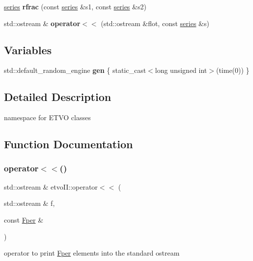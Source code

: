 \begin{DoxyCompactItemize}
\item 
\mbox{\label{namespaceetvo_i_i_a48f35f2917034aa30ea99e89d9da1354}} 
\mbox{\hyperlink{classetvo_i_i_1_1series}{series}} {\bfseries rfrac} (const \mbox{\hyperlink{classetvo_i_i_1_1series}{series}} \&s1, const \mbox{\hyperlink{classetvo_i_i_1_1series}{series}} \&s2)
\item 
\mbox{\label{namespaceetvo_i_i_a96938f46f78231e8b1d4ca37cd3528d6}} 
std\+::ostream \& {\bfseries operator$<$$<$} (std\+::ostream \&flot, const \mbox{\hyperlink{classetvo_i_i_1_1series}{series}} \&s)
\end{DoxyCompactItemize}
\subsection*{Variables}
\begin{DoxyCompactItemize}
\item 
\mbox{\label{namespaceetvo_i_i_a1bfb12d5c99ed9b6c9332f116b3a6c07}} 
std\+::default\+\_\+random\+\_\+engine {\bfseries gen} \{ static\+\_\+cast$<$long unsigned int$>$(time(0)) \}
\end{DoxyCompactItemize}


\subsection{Detailed Description}
namespace for E\+T\+VO classes 

\subsection{Function Documentation}
\mbox{\label{namespaceetvo_i_i_a462212bcba4cc820676526d88ddbfb87}} 
\subsubsection{\texorpdfstring{operator$<$$<$()}{operator<<()}}
{\footnotesize\ttfamily std\+::ostream \& etvo\+I\+I\+::operator$<$$<$ (\begin{DoxyParamCaption}\item[{std\+::ostream \&}]{f,  }\item[{const \mbox{\hyperlink{classetvo_i_i_1_1_fper}{Fper}} \&}]{ }\end{DoxyParamCaption})}



operator to print \mbox{\hyperlink{classetvo_i_i_1_1_fper}{Fper}} elements into the standard ostream 

